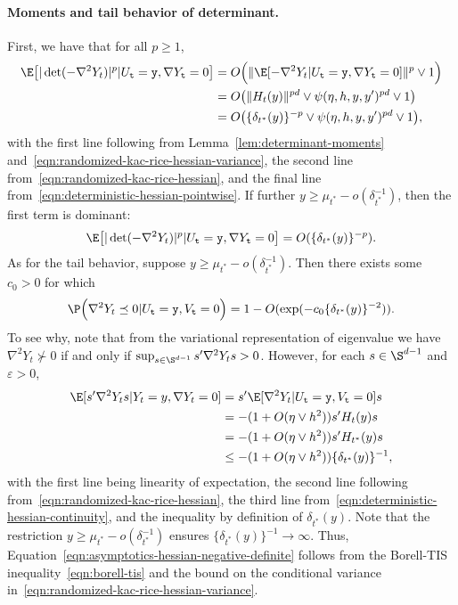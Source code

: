 \documentclass{article}
\begin{document}
	\paragraph{Moments and tail behavior of determinant.}
	First, we have that for all $p \geq 1$, 
	\begin{equation}
		\begin{aligned}
			\label{eqn:asymptotics-hessian-determinant-moments}
			\E\big[|\det(-\nabla^2 Y_t)|^p|U_{{\tt t}} = {\tt y},\nabla Y_{{\tt t}} = 0\big] 
			& = O\Big(\|\E[-\nabla^2 Y_t|U_{{\tt t}} = {\tt y},\nabla Y_{{\tt t}} = 0]\|^p \vee 1\Big) \\
			& = O\big(\|H_t(y)\|^{pd} \vee \psi(\eta,h,y,y')^{pd} \vee 1\big) \\
			& = O\big(\{\delta_{t^*}(y)\}^{-p} \vee \psi(\eta,h,y,y')^{pd} \vee 1\big),
		\end{aligned}
	\end{equation}
	with the first line following from Lemma~\ref{lem:determinant-moments} and~\eqref{eqn:randomized-kac-rice-hessian-variance}, the second line from~\eqref{eqn:randomized-kac-rice-hessian}, and the final line from~\eqref{eqn:deterministic-hessian-pointwise}. If further $y \geq \mu_{t^*} - o(\delta_{t^*}^{-1})$, then the first term is dominant:
	\begin{equation}
		\label{eqn:asymptotics-hessian-determinant-moments-2}
		\E\big[|\det(-\nabla^2 Y_t)|^p|U_{{\tt t}} = {\tt y},\nabla Y_{{\tt t}} = 0\big] = O(\{\delta_{t^*}(y)\}^{-p}).
	\end{equation}
	As for the tail behavior, suppose $y \geq \mu_{t^*} - o(\delta_{t^*}^{-1})$. Then there exists some $c_0 > 0$ for which
	\begin{equation}
		\label{eqn:asymptotics-hessian-negative-definite}
		\P\Big(\nabla^2 Y_t \preceq  0|U_{{\tt t}} = {\tt y}, V_{{\tt t}} = 0\Big) = 1 - O(\exp(-c_0\{\delta_{t^*}(y)\}^{-2})).
	\end{equation}
	To see why, note that from the variational representation of eigenvalue we have $\nabla^2 Y_t \not\succ 0$ if and only if $\sup_{s \in \S^{d - 1}} s'\nabla^2 Y_ts > 0$. However, for each $s \in \S^{d - 1}$ and $\varepsilon > 0$,
	\begin{align*}
		\E[s'\nabla^2 Y_t s|Y_t = y,\nabla Y_t = 0] 
		& = s'\E[\nabla^2 Y_t |U_{{\tt t}} = {\tt y}, V_{{\tt t}} = 0]s \\
		& = -(1 + O(\eta \vee h^2)) s' H_t(y)s \\
		& = -(1 + O(\eta \vee h^2)) s' H_{t^*}(y)s \\
		& \leq  -(1 + O(\eta \vee h^2)) \{\delta_{{t^*}}(y)\}^{-1},
	\end{align*}
	with the first line being linearity of expectation, the second line following from~\eqref{eqn:randomized-kac-rice-hessian}, the third line from~\eqref{eqn:deterministic-hessian-continuity}, and the inequality by definition of $\delta_{t^*}(y)$. Note that the restriction $y \geq \mu_{t^*} - o(\delta_{t^*}^{-1})$ ensures $\{\delta_{t^*}(y)\}^{-1} \to \infty$. Thus, Equation~\eqref{eqn:asymptotics-hessian-negative-definite} follows from the Borell-TIS inequality~\eqref{eqn:borell-tis} and the bound on the conditional variance in~\eqref{eqn:randomized-kac-rice-hessian-variance}. 
	
\end{document}
